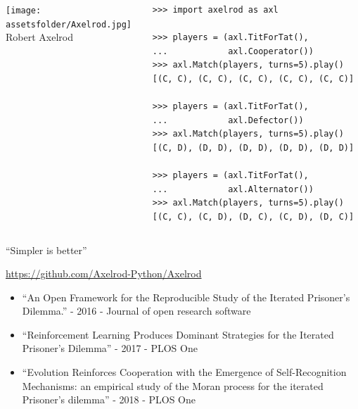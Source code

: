 \documentclass{beamer}
\newcommand{\assetsfolder}{./assets}
\begin{document}
    \begin{frame}[fragile]{}
        \begin{columns}
            \begin{column}{.4\textwidth}
                \begin{center}
                    \texttt{[image: \\assetsfolder/Axelrod.jpg]}
                    \\
                    Robert Axelrod
                \end{center}
            \end{column}
            \pause
            \begin{column}{.6\textwidth}
                \begin{verbatim}
>>> import axelrod as axl

>>> players = (axl.TitForTat(),
...            axl.Cooperator())
>>> axl.Match(players, turns=5).play()
[(C, C), (C, C), (C, C), (C, C), (C, C)]

>>> players = (axl.TitForTat(),
...            axl.Defector())
>>> axl.Match(players, turns=5).play()
[(C, D), (D, D), (D, D), (D, D), (D, D)]

>>> players = (axl.TitForTat(),
...            axl.Alternator())
>>> axl.Match(players, turns=5).play()
[(C, C), (C, D), (D, C), (C, D), (D, C)]

                \end{verbatim}
            \end{column}
        \end{columns}
\end{frame}

    \begin{frame}
        \begin{center}
            \Huge
            ``Simpler is better''
        \end{center}
    \end{frame}

    \begin{frame}
        \begin{center}
            \Large
            \url{https://github.com/Axelrod-Python/Axelrod}
        \end{center}

        \begin{itemize}
            \item  ``An Open Framework for the Reproducible Study of the Iterated
                Prisoner’s Dilemma.'' - 2016 - Journal of open research software
            \item  ``Reinforcement Learning Produces Dominant Strategies for
                the Iterated Prisoner's Dilemma'' - 2017 - PLOS One
            \item  ``Evolution Reinforces Cooperation with the Emergence of
                Self-Recognition Mechanisms: an empirical study of the Moran
                process for the iterated Prisoner's dilemma'' - 2018 - PLOS One
        \end{itemize}
    \end{frame}
\end{document}
